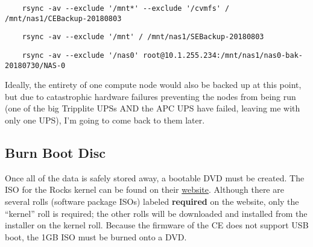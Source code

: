 \documentclass[12pt]{article}
\begin{document}
\begin{tcolorbox}[title=Backup the CE (executed in CE), colback=white,
  colframe=black, coltitle=green]
  \begin{verbatim}
    rsync -av --exclude '/mnt*' --exclude '/cvmfs' / /mnt/nas1/CEBackup-20180803
  \end{verbatim}
\end{tcolorbox}

\begin{tcolorbox}[title=Backup the SE (executed in SE), colback=white,
  colframe=black, coltitle=green]
  \begin{verbatim}
    rsync -av --exclude '/mnt' / /mnt/nas1/SEBackup-20180803
  \end{verbatim}  
\end{tcolorbox}

\begin{tcolorbox}[title=Backup the server partition of NAS-0 (executed in CE),
  colback=white, colframe=black, coltitle=green]
  \begin{verbatim}
    rsync -av --exclude '/nas0' root@10.1.255.234:/mnt/nas1/nas0-bak-20180730/NAS-0
  \end{verbatim}
\end{tcolorbox}

\qq Ideally, the entirety of one compute node would also be backed up at this
point, but due to catastrophic hardware failures preventing the nodes from being
run (one of the big Tripplite UPSs AND the APC UPS have failed, leaving me with
only one UPS), I'm going to come back to them later.

\subsection{Burn Boot Disc}

\qq Once all of the data is safely stored away, a bootable DVD must be
created. The ISO for the Rocks kernel can be found on their
\href{http://www.rocksclusters.org/downloads/2017-12-01-download-rocks-7-0-manzanita.html}{website}. Although
there are several rolls (software package ISOs) labeled \textbf{required} on the
website, only the ``kernel'' roll is required; the other rolls will be
downloaded and installed from the installer on the kernel roll. Because the
firmware of the CE does not support USB boot, the 1GB ISO must be burned onto a
DVD.
\end{document}
